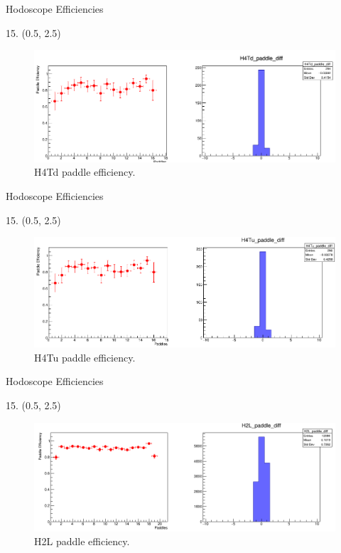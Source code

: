 \documentclass[12pt, xcolor={dvipsnames}, aspectratio = 169, sans,mathserif]{beamer}
\newenvironment{Pic}[2]
{
\begin{textblock}{#1} #2
\begin{figure}
}
{
\end{figure}
\end{textblock}
}
\begin{document}
\begin{frame}{Hodoscope Efficiencies}
\begin{Pic}{15.}{(0.5, 2.5)}
  \includegraphics[width=15.0cm]{imgs/H4Td_paddle_diff.png}
  \caption{H4Td paddle efficiency.}
\end{Pic}
\end{frame}

\begin{frame}{Hodoscope Efficiencies}
\begin{Pic}{15.}{(0.5, 2.5)}
  \includegraphics[width=15.0cm]{imgs/H4Tu_paddle_diff.png}
  \caption{H4Tu paddle efficiency.}
\end{Pic}
\end{frame}

\begin{frame}{Hodoscope Efficiencies}
\begin{Pic}{15.}{(0.5, 2.5)}
  \includegraphics[width=15.0cm]{imgs/H2L_paddle_diff.png}
  \caption{H2L paddle efficiency.}
\end{Pic}
\end{frame}
\end{document}
